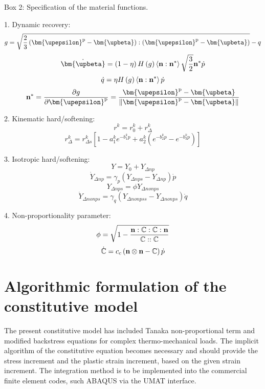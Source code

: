 \begin{framed}
\label{Box:1}
Box 2: Specification of the material functions.

1. Dynamic recovery:
\[g = \sqrt {\frac{2}{3}\left( {{{\bm{\upepsilon }}^{\rm{p}}} - {\bm{\upbeta}}} \right):\left( {{{\bm{\upepsilon }}^{\rm{p}}} - {\bm{\upbeta}}} \right)}  - q\]
\[{\dot{\bm{\upbeta}}}  = \left( {1 - \eta } \right)H\left( g \right)\left\langle {{\bf{n}}:{{\bf{n}}^*}} \right\rangle \sqrt {\frac{3}{2}} {{\bf{n}}^*}\dot p\]
\[\dot q = \eta H\left( g \right)\left\langle {{\bf{n}}:{{\bf{n}}^*}} \right\rangle \dot p\]
\[{{\bf{n}}^*} = \frac{{\partial g}}{{\partial {{\bm{\upepsilon }}^{\rm{p}}}}} = \frac{{{{\bm{\upepsilon }}^{\rm{p}}} - {\bm{\upbeta}}}}{{\left\| {{{\bm{\upepsilon }}^{\rm{p}}} - {\bm{\upbeta}}} \right\|}}\]

2. Kinematic hard/softening:
\[{r^k} = r_0^k + r_\Delta ^k\]
\[r_\Delta ^k = r_{\Delta s}^k\left[ {1 - a_1^k{e^{ - b_1^kp}} + a_2^k({e^{ - b_2^kp}} - {e^{ - b_3^kp}})} \right]\]

3. Isotropic hard/softening:
\[Y = {Y_0} + {Y_{\Delta np}}\]
\[{\dot Y_{\Delta np}} = {\gamma _p}\left( {{Y_{\Delta nps}} - {Y_{\Delta np}}} \right)\dot p\]
\[{Y_{\Delta nps}} = \phi {Y_{\Delta nonps}}\]
\[{\dot Y_{\Delta nonps}} = {\gamma _q}\left( {{Y_{\Delta nonpss}} - {Y_{\Delta nonps}}} \right)\dot q\]


4. Non-proportionality parameter:
\[\phi  = \sqrt {1 - \frac{{{\bf{n}}:\mathbb{C}:\mathbb{C}:{\bf{n}}}}{{\mathbb{C}::\mathbb{C}}}} \]
\[\dot {\mathbb{C}} = {c_c}\left( {{\bf{n}} \otimes {\bf{n}} - \mathbb{C}} \right)\dot p\]

\end{framed}

\section{Algorithmic formulation of the constitutive model}
\noindent
The present constitutive model has included Tanaka non-proportional term and modified backstress equations for complex thermo-mechanical loads. The implicit algorithm of the constitutive equation becomes necessary and should provide the stress increment and the plastic strain increment, based on the given strain increment. The integration method is to be implemented into the commercial finite element codes, such ABAQUS via the UMAT interface.

